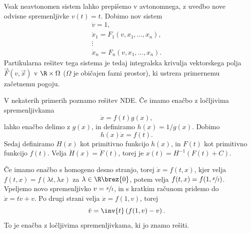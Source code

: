 Vsak neavtonomen sistem lahko prepišemo v avtonomnega, z uvedbo nove odvisne
spremenljivke $v(t) = t$.
Dobimo nov sistem
\begin{gather*}
  \dot{v} = 1, \\
  \dot{x}_1 = F_1(v, x_1, \ldots, x_n), \\
  \vdots \\
  \dot{x}_n = F_n(v, x_1, \ldots, x_n).
\end{gather*}
Partikularna rešitev tega sistema je tedaj integralska krivulja vektorskega
polja $\vec{F}(v, \vec{x})$ v  $\R \times
\Omega$ ($\Omega$ je običajen fazni prostor), ki ustreza primernemu začetnemu
pogoju.


V nekaterih primerih poznamo rešitev NDE.
Če imamo enačbo z ločljivima spremenljivkama
\[
  \dot{x} = f(t) g(x),
\]
lahko enačbo delimo z $g(x)$, in definiramo $h(x) = 1 / g(x)$.
Dobimo
\[
  h(x) \dot{x} = f(t).
\]
Sedaj definiramo $H(x)$ kot primitivno funkcijo $h(x)$, in $F(t)$ kot primitivno
funkcijo $f(t)$.
Velja $\dot{H}(x) = \dot{F}(t)$, torej je $x(t) = H^{-1}(F(t) + C)$.


Če imamo enačbo s homogeno desno stranjo, torej $\dot{x} = f(t, x)$, kjer velja
$f(t,x) = f(\lambda t, \lambda x)$ za $\lambda \in \R \brez \{0\}$,
potem velja $f(t, x) = f(1, \nicefrac{x}{t})$.
Vpeljemo novo spremenljivko $v = \nicefrac{x}{t}$, in s kratkim računom pridemo
do $\dot{x} = t \dot{v} + v$.
Po drugi strani velja $\dot{x} = f(1, v)$, torej
\[
  \dot{v} = \inv{t} \left(f(1, v) - v\right).
\]
To je enačba z ločljivima spremenljivkama, ki jo znamo rešiti.

